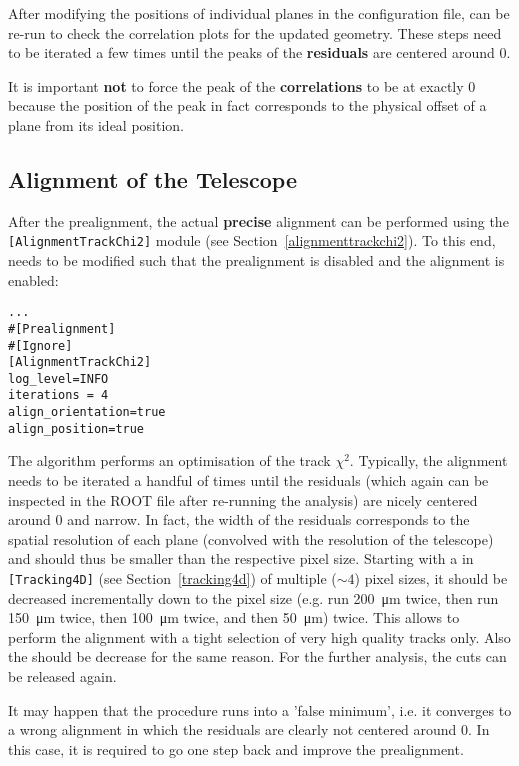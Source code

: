 After modifying the positions of individual planes in the configuration file, \corry can be re-run to check the correlation plots for the updated geometry.
These steps need to be iterated a few times until the peaks of the \textbf{residuals} are centered around 0.
 
It is important \textbf{not} to force the peak of the \textbf{correlations} to be at exactly 0 because the position of the peak in fact corresponds to the physical offset of a plane from its ideal position. 


\subsection*{Alignment of the Telescope}
After the prealignment, the actual \textbf{precise} alignment can be performed using the \texttt{[AlignmentTrackChi2]} module (see Section~\ref{alignmenttrackchi2}).
To this end,  needs to be modified such that the prealignment is disabled and the alignment is enabled:
\begin{verbatim}
...
#[Prealignment]
#[Ignore]
[AlignmentTrackChi2]
log_level=INFO
iterations = 4
align_orientation=true
align_position=true
\end{verbatim}

The algorithm performs an optimisation of the track $\chi^2$.
Typically, the alignment needs to be iterated a handful of times until the residuals (which again can be inspected in the ROOT file after re-running the analysis) are nicely centered around 0 and narrow.
In fact, the width of the residuals corresponds to the spatial resolution of each plane (convolved with the resolution of the telescope) and should thus be smaller than the respective pixel size.
Starting with a  in \texttt{[Tracking4D]} (see Section~\ref{tracking4d}) of multiple ($\sim4$) pixel sizes, it should be decreased incrementally down to the pixel size (e.g. run \SI{200}{\micro\m} twice, then run \SI{150}{\micro\m} twice, then \SI{100}{\micro\m} twice, and then \SI{50}{\micro\m}) twice.
This allows to perform the alignment with a tight selection of very high quality tracks only.
Also the  should be decrease for the same reason.
For the further analysis, the cuts can be released again.

It may happen that the procedure runs into a 'false minimum', i.e. it converges to a wrong alignment in which the residuals are clearly not centered around 0.
In this case, it is required to go one step back and improve the prealignment.

